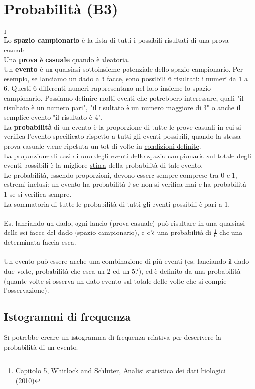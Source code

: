 \documentclass[drafts, 10pt]{book}
\begin{document}
\chapter{Probabilità (B3)}\footnote{Capitolo 5, Whitlock and Schluter, Analisi statistica dei dati biologici (2010)}
\\
Lo \textbf{spazio campionario} è la lista di tutti i possibili risultati di una prova casuale.
\\
Una \textbf{prova} è \textbf{casuale} quando è aleatoria.
\\
Un \textbf{evento} è un qualsiasi sottoinsieme potenziale dello spazio campionario. Per esempio, se lanciamo un dado a 6 facce, sono possibili 6 risultati: i numeri da 1 a 6. Questi 6 differenti numeri rappresentano nel loro insieme lo spazio campionario. Possiamo definire molti eventi che potrebbero interessare, quali "il risultato è un numero pari", "il risultato è un numero maggiore di 3" o anche il semplice evento "il risultato è 4". 
\\
La \textbf{probabilità} di un evento è la proporzione di tutte le prove casuali in cui si verifica l'evento specificato rispetto a tutti gli eventi possibili, quando la stessa prova casuale viene ripetuta un tot di volte in \underline{condizioni definite}.
\\
La proporzione di casi di uno degli eventi dello spazio campionario sul totale degli eventi possibili è la migliore \underline{stima} della probabilità di tale evento.
\\
Le probabilità, essendo proporzioni, devono essere sempre comprese tra 0 e 1, estremi inclusi: un evento ha probabilità 0 se non si verifica mai e ha probabilità 1 se si verifica sempre.
\\
La sommatoria di tutte le probabilità di tutti gli eventi possibili è pari a 1.
\\
\\
Es. lanciando un dado, ogni lancio (prova casuale) può risultare in una qualsiasi delle sei facce del dado (spazio campionario), e c’è una probabilità di $\frac{1}{6}$ che una determinata faccia esca.
\\
\\
Un evento può essere anche una combinazione di più eventi (es. lanciando il dado due volte, probabilità che esca un 2 ed un 5?), ed è definito da una probabilità (quante volte si osserva un dato evento sul totale delle volte che si compie l’osservazione).

\section{Istogrammi di frequenza}
Si potrebbe creare un istogramma di frequenza relativa per descrivere la probabilità di un evento.
\end{document}
